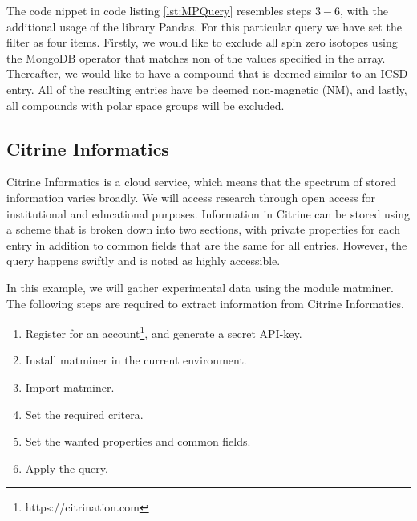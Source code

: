 The code nippet in code listing \ref{lst:MPQuery} resembles steps $3-6$, with the additional usage of the library Pandas. For this particular query we have set the filter as four items. Firstly, we would like to exclude all spin zero isotopes using the MongoDB operator that matches non of the values specified in the array. Thereafter, we would like to have a compound that is deemed similar to an ICSD entry. All of the resulting entries have be deemed non-magnetic (NM), and lastly, all compounds with polar space groups will be excluded.



\subsection{Citrine Informatics}

Citrine Informatics is a cloud service, which means that the spectrum of stored information varies broadly. We will access research through open access for institutional and educational purposes. Information in Citrine can be stored using a scheme that is broken down into two sections, with private properties for each entry in addition to common fields that are the same for all entries. However, the query happens swiftly and is noted as highly accessible.

In this example, we will gather experimental data using the module matminer. The following steps are required to extract information from Citrine Informatics.

\begin{enumerate}
  \item Register for an account\footnote{https://citrination.com}, and generate a secret API-key.
  \item Install matminer in the current environment.
  \item Import matminer.
  \item Set the required critera.
  \item Set the wanted properties and common fields.
  \item Apply the query.
\end{enumerate}

